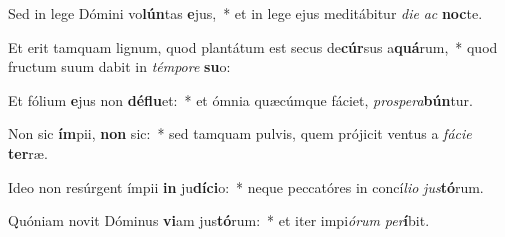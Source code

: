 \item Sed in lege Dómini vo\textbf{lún}tas \textbf{e}jus,~* et in lege ejus meditábitur \textit{di}\textit{e} \textit{ac} \textbf{noc}te.
\item Et erit tamquam lignum, quod plantátum est secus de\textbf{cúr}sus a\textbf{quá}rum,~* quod fructum suum dabit in \textit{tém}\textit{po}\textit{re} \textbf{su}o:
\item Et fólium \textbf{e}jus non \textbf{dé}\textbf{flu}et:~* et ómnia quæcúmque fáciet, \textit{pro}\textit{spe}\textit{ra}\textbf{bún}tur.
\item Non sic \textbf{ím}pii, \textbf{non} sic:~* sed tamquam pulvis, quem prójicit ventus a \textit{fá}\textit{ci}\textit{e} \textbf{ter}ræ.
\item Ideo non resúrgent ímpii \textbf{in} ju\textbf{dí}\textbf{ci}o:~* neque peccatóres in concí\textit{li}\textit{o} \textit{jus}\textbf{tó}rum.
\item Quóniam novit Dóminus \textbf{vi}am jus\textbf{tó}rum:~* et iter impi\textit{ó}\textit{rum} \textit{per}\textbf{í}bit.
